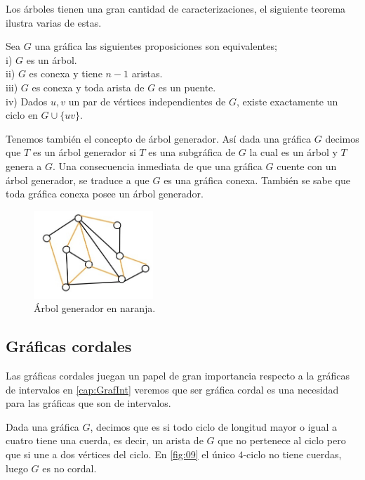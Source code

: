 Los árboles tienen una gran cantidad de caracterizaciones, el siguiente teorema ilustra varias de estas.

\begin{teorema}
\label{teo:101}
    Sea $G$ una gráfica las siguientes proposiciones son equivalentes;\\
    i) $G$ es un árbol.\\
    ii) $G$ es conexa y tiene $n-1$ aristas.\\
    iii) $G$ es conexa y toda arista de $G$ es un puente.\\
    iv) Dados $u,v$ un par de vértices independientes de $G$, existe exactamente un ciclo en $G\cup \{uv\}$.
\end{teorema}

Tenemos también el concepto de árbol generador. Así dada una gráfica $G$ decimos que $T$ es un árbol generador si $T$ es una subgráfica de $G$ la cual es un árbol y $T$ genera a $G$.
Una consecuencia inmediata de que una gráfica $G$ cuente con un árbol generador, se traduce a que $G$ es una gráfica conexa. También se sabe que toda gráfica conexa posee un árbol generador.

\begin{figure}[H]
  \centering
  \includegraphics[width=0.4\textwidth]{recursos/capturas/17.jpg}
  \caption{Árbol generador en naranja.}
  \label{fig:15}
\end{figure}


\subsection{Gr\'aficas cordales}
Las gráficas cordales juegan un papel de gran importancia respecto a la gráficas de intervalos en \cref{cap:GrafInt} veremos que ser gráfica cordal es una necesidad para las gráficas que son de intervalos. 

Dada una gráfica $G$, decimos que es  si todo ciclo de longitud mayor o igual a cuatro tiene una cuerda, es decir, un arista de $G$ que no pertenece al ciclo pero que si une a dos vértices del ciclo. En \cref{fig:09} el único $4$-ciclo no tiene cuerdas, luego $G$ es no cordal.

